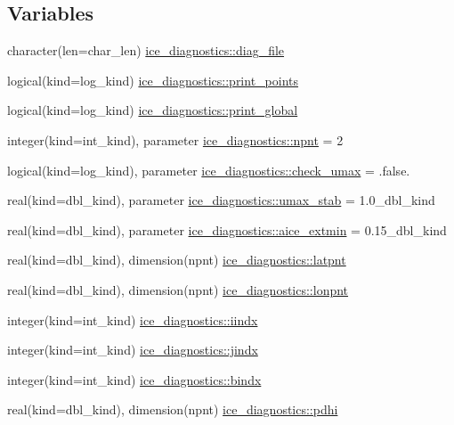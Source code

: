 \subsection*{Variables}
\begin{DoxyCompactItemize}
\item 
character(len=char\_\-len) \hyperlink{namespaceice__diagnostics_a0a7c9100fd06a3512e3f27d229758d8c}{ice\_\-diagnostics::diag\_\-file}
\item 
logical(kind=log\_\-kind) \hyperlink{namespaceice__diagnostics_a673176ef3ac5261be4052bc66ecec3cf}{ice\_\-diagnostics::print\_\-points}
\item 
logical(kind=log\_\-kind) \hyperlink{namespaceice__diagnostics_a0f58339d06d864451082d8805eaa03b1}{ice\_\-diagnostics::print\_\-global}
\item 
integer(kind=int\_\-kind), parameter \hyperlink{namespaceice__diagnostics_aab9ed37bb736e9c83d4bf276c8010dc2}{ice\_\-diagnostics::npnt} = 2
\item 
logical(kind=log\_\-kind), parameter \hyperlink{namespaceice__diagnostics_a2a08d0704bb691e6ffeaec5bd6d8cbc4}{ice\_\-diagnostics::check\_\-umax} = .false.
\item 
real(kind=dbl\_\-kind), parameter \hyperlink{namespaceice__diagnostics_aa1bd3bdd9f09aa609191984ea21310c9}{ice\_\-diagnostics::umax\_\-stab} = 1.0\_\-dbl\_\-kind
\item 
real(kind=dbl\_\-kind), parameter \hyperlink{namespaceice__diagnostics_aabe1b0ea631c03eded45a36cdd99fd21}{ice\_\-diagnostics::aice\_\-extmin} = 0.15\_\-dbl\_\-kind
\item 
real(kind=dbl\_\-kind), dimension(npnt) \hyperlink{namespaceice__diagnostics_a098c8da869ccfcbbd1ed9aea5124ee59}{ice\_\-diagnostics::latpnt}
\item 
real(kind=dbl\_\-kind), dimension(npnt) \hyperlink{namespaceice__diagnostics_ac674492c3212f73e6ab2a93e41774c0b}{ice\_\-diagnostics::lonpnt}
\item 
integer(kind=int\_\-kind) \hyperlink{namespaceice__diagnostics_a1a0b626616a7d9a32101d00161d2b574}{ice\_\-diagnostics::iindx}
\item 
integer(kind=int\_\-kind) \hyperlink{namespaceice__diagnostics_ae14da62eafd352886088d4688a3a2129}{ice\_\-diagnostics::jindx}
\item 
integer(kind=int\_\-kind) \hyperlink{namespaceice__diagnostics_a531e9ef9082091f153db74c9a1816c12}{ice\_\-diagnostics::bindx}
\item 
real(kind=dbl\_\-kind), dimension(npnt) \hyperlink{namespaceice__diagnostics_ae9176a1e4ff6d526241dfbc185fef462}{ice\_\-diagnostics::pdhi}

\end{DoxyCompactItemize}
